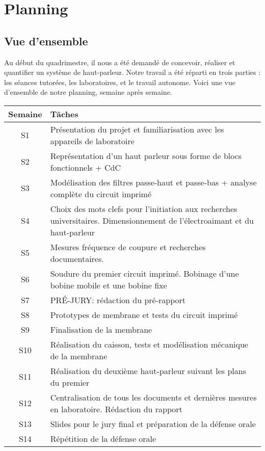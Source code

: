 

\section{Planning}

\subsection{Vue d'ensemble}
Au début du quadrimestre, il nous a été demandé de concevoir, réaliser et quantifier un système de haut-parleur.
Notre travail a été réparti en trois parties : les séances tutorées, les laboratoires, et le travail autonome. 
Voici une vue d'ensemble de notre planning, semaine après semaine. \\


\begin{tabular}{|c||p{9cm}|}
	\hline 
	Semaine & Tâches \\
	\hline
	\hline
  S1 & Présentation du projet et familiarisation avec les appareils de laboratoire\\
  S2 & Représentation d'un haut parleur sous forme de blocs fonctionnels +  CdC\\
	S3 & Modélisation des filtres passe-haut et passe-bas + analyse complète du circuit imprimé\\
	S4 & Choix des mots clefs pour l'initiation aux recherches universitaires. Dimensionnement de l'électroaimant et du haut-parleur\\
	S5 & Mesures fréquence de coupure et recherches documentaires. \\
	S6 & Soudure du premier circuit imprimé. Bobinage d'une bobine mobile et une bobine fixe\\
	S7 & PRÉ-JURY: rédaction du pré-rapport\\
	S8 & Prototypes de membrane et tests du circuit imprimé\\
	S9 & Finalisation de la membrane\\
	S10 & Réalisation du caisson, tests et modélisation mécanique de la membrane\\
	S11 & Réalisation du deuxième haut-parleur suivant les plans du premier\\
	S12 & Centralisation de tous les documents et dernières mesures en laboratoire. Rédaction du rapport\\
	S13 & Slides pour le jury final et préparation de la défense orale\\
	S14 & Répétition de la défense orale\\
	\hline
\end{tabular}


